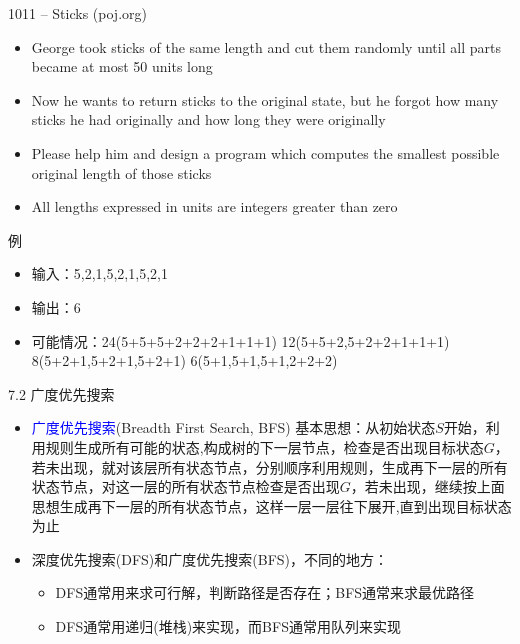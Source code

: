 \begin{frame}{1011 -- Sticks (poj.org)}
    \begin{itemize}
        \item George took sticks of the same length and cut them randomly until all parts became at most 50 units long
        \item Now he wants to return sticks to the original state, but he forgot how many sticks he had originally and how long they were originally
        \item Please help him and design a program which computes the smallest possible original length of those sticks
        \item All lengths expressed in units are integers greater than zero
    \end{itemize}
    \begin{exampleblock}{例}
        \begin{itemize}
            \item 输入：5,2,1,5,2,1,5,2,1
            \item 输出：6
            \item 可能情况：24(5+5+5+2+2+2+1+1+1) 12(5+5+2,5+2+2+1+1+1) 8(5+2+1,5+2+1,5+2+1) 6(5+1,5+1,5+1,2+2+2)
        \end{itemize}
    \end{exampleblock}
\end{frame}    
\begin{frame}{7.2 广度优先搜索}
    \begin{itemize}
        \item \textcolor{blue}{广度优先搜索}(Breadth First Search, BFS) 基本思想：从初始状态$S$开始，利用规则生成所有可能的状态,构成树的下一层节点，检查是否出现目标状态$G$，若未出现，就对该层所有状态节点，分别顺序利用规则，生成再下一层的所有状态节点，对这一层的所有状态节点检查是否出现$G$，若未出现，继续按上面思想生成再下一层的所有状态节点，这样一层一层往下展开,直到出现目标状态为止
        \item 深度优先搜索(DFS)和广度优先搜索(BFS)，不同的地方：
        \begin{itemize}
            \item DFS通常用来求可行解，判断路径是否存在；BFS通常来求最优路径
            \item DFS通常用递归(堆栈)来实现，而BFS通常用队列来实现
        \end{itemize}
    \end{itemize}
\end{frame}
